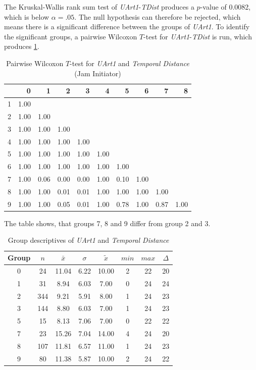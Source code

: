 The Kruskal-Wallis rank sum test of \textit{UArt1}-\textit{TDist} produces a $p$-value of 0.0082, which is below $\alpha=.05$. The null hypothesis can therefore be rejected, which means there is a significant difference between the groups of \textit{UArt1}. To identify the significant groups, a pairwise Wilcoxon $T$-test for \textit{UArt1}-\textit{TDist} is run, which produces \cref{tbl:wilcoxon_baysis_initiator_UArt_TDist}. 
\begin{table}[ht]
	\tiny
	\centering
    \begin{tabular}{rrrrrrrrrr}
        \toprule
          & 0 & 1 & 2 & 3 & 4 & 5 & 6 & 7 & 8 \\ 
        \midrule
        1 & 1.00 &  &  &  &  &  &  &  &  \\ 
        2 & 1.00 & 1.00 &  &  &  &  &  &  &  \\ 
        3 & 1.00 & 1.00 & 1.00 &  &  &  &  &  &  \\ 
        4 & 1.00 & 1.00 & 1.00 & 1.00 &  &  &  &  &  \\ 
        5 & 1.00 & 1.00 & 1.00 & 1.00 & 1.00 &  &  &  &  \\ 
        6 & 1.00 & 1.00 & 1.00 & 1.00 & 1.00 & 1.00 &  &  &  \\ 
        7 & 1.00 & 0.06 & 0.00 & 0.00 & 1.00 & 0.10 & 1.00 &  &  \\ 
        8 & 1.00 & 1.00 & 0.01 & 0.01 & 1.00 & 1.00 & 1.00 & 1.00 &  \\ 
        9 & 1.00 & 1.00 & 0.05 & 0.01 & 1.00 & 0.78 & 1.00 & 0.87 & 1.00 \\ 
        \bottomrule
      \end{tabular}
    \caption{Pairwise Wilcoxon $T$-test for \textit{UArt1} and \textit{Temporal Distance} (Jam Initiator)}
    \label{tbl:wilcoxon_baysis_initiator_UArt_TDist}
\end{table}
The table shows, that groups 7, 8 and 9 differ from group 2 and 3.
\begin{table}[ht]
	\tiny
	\centering
    \begin{tabular}{c|c|c|c|c|c|c|c}
        \toprule
        Group & $n$ & $\bar{x}$ & $\sigma$ & $\tilde{x}$ & $min$ & $max$ & $\Delta$ \\
        \midrule
        0 & 24  & 11.04 & 6.22 & 10.00 & 2  & 22 & 20 \\ 
        1 & 31  & 8.94  & 6.03 & 7.00  & 0  & 24 & 24 \\ 
        2 & 344 & 9.21 & 5.91 & 8.00  & 1  & 24 & 23 \\ 
        3 & 144 & 8.80  & 6.03 & 7.00  & 1  & 24 & 23 \\ 
        5 & 15  & 8.13  & 7.06 & 7.00  & 0  & 22 & 22 \\ 
        7 & 23  & 15.26 & 7.04 & 14.00 & 4  & 24 & 20 \\ 
        8 & 107 & 11.81 & 6.57 & 11.00 & 1  & 24 & 23 \\ 
        9 & 80  & 11.38 & 5.87 & 10.00 & 2  & 24 & 22 \\ 
        \bottomrule
      \end{tabular}
    \caption{Group descriptives of \textit{UArt1} and \textit{Temporal Distance}}
    \label{tbl:descriptives_baysis_initiator_UArt_TDist}
\end{table}

